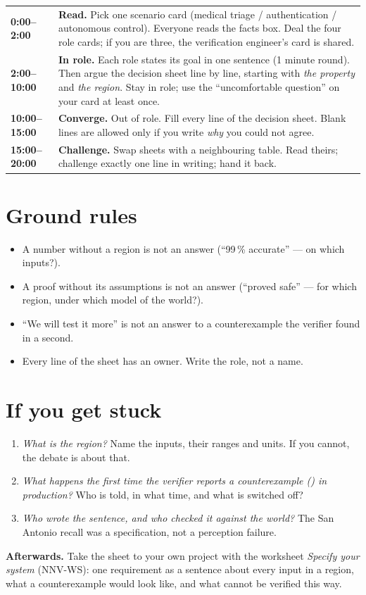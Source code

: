 \documentclass[11pt]{article}
\begin{document}
\begin{tabularx}{\textwidth}{@{}lX@{}}
\toprule
\textbf{0:00–2:00} & \textbf{Read.} Pick one scenario card (medical triage / authentication / autonomous control). Everyone reads the facts box. Deal the four role cards; if you are three, the verification engineer's card is shared.\\
\textbf{2:00–10:00} & \textbf{In role.} Each role states its goal in one sentence (1 minute round). Then argue the decision sheet line by line, starting with \emph{the property} and \emph{the region}. Stay in role; use the ``uncomfortable question'' on your card at least once.\\
\textbf{10:00–15:00} & \textbf{Converge.} Out of role. Fill every line of the decision sheet. Blank lines are allowed only if you write \emph{why} you could not agree.\\
\textbf{15:00–20:00} & \textbf{Challenge.} Swap sheets with a neighbouring table. Read theirs; challenge exactly one line in writing; hand it back.\\
\bottomrule
\end{tabularx}

\section*{Ground rules}
\begin{itemize}
  \item A number without a region is not an answer (``99\,\% accurate'' — on which inputs?).
  \item A proof without its assumptions is not an answer (``proved safe'' — for which region, under which model of the world?).
  \item ``We will test it more'' is not an answer to a counterexample the verifier found in a second.
  \item Every line of the sheet has an owner. Write the role, not a name.
\end{itemize}

\section*{If you get stuck}
\begin{enumerate}
  \item \emph{What is the region?} Name the inputs, their ranges and units. If you cannot, the debate is about that.
  \item \emph{What happens the first time the verifier reports a counterexample (\badmark) in production?} Who is told, in what time, and what is switched off?
  \item \emph{Who wrote the sentence, and who checked it against the world?} The San Antonio recall was a specification, not a perception failure.
\end{enumerate}

\begin{notebox}
\textbf{Afterwards.} Take the sheet to your own project with the worksheet \emph{Specify your system} (NNV-WS): one requirement as a sentence about every input in a region, what a counterexample would look like, and what cannot be verified this way.
\end{notebox}
\end{document}
